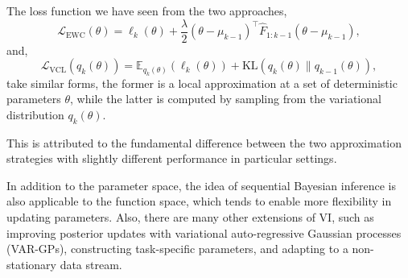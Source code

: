 \documentclass[9pt,dvipsnames]{beamer}
\begin{document}
\begin{frame}
    The loss function we have seen from the two approaches,
    $$
        \mathcal{L}_{\mathrm{EWC}}(\theta)=\ell_{k}(\theta)+\frac{\lambda}{2}\left(\theta-\mu_{k-1}\right)^{\top} \hat{F}_{1: k-1}\left(\theta-\mu_{k-1}\right),
    $$
    and,
    $$
        \mathcal{L}_{\mathrm{VCL}}\left(q_{k}(\theta)\right)=\mathbb{E}_{q_{k}(\theta)}\left(\ell_{k}(\theta)\right)+\mathrm{KL}\left(q_{k}(\theta) \| q_{k-1}(\theta)\right),
    $$
    take similar forms, the former is a local approximation at a set of deterministic parameters $\theta$, while the latter is computed by sampling from the variational distribution $q_{k}(\theta)$.

    This is  attributed to the fundamental difference between the two approximation strategies with slightly different performance in particular settings.
\end{frame}

\begin{frame}
    In addition to the parameter space, the idea of sequential Bayesian inference is also applicable to the function space, which tends to enable more flexibility in updating parameters. Also, there are many other extensions of VI, such as improving posterior updates with variational auto-regressive Gaussian processes (VAR-GPs), constructing task-specific parameters, and adapting to a non-stationary data stream.
\end{frame}
\end{document}
